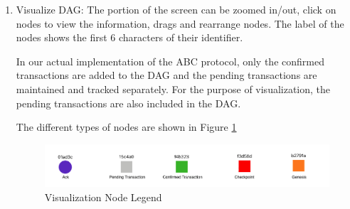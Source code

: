 \begin{enumerate}
	\item Visualize DAG: The portion of the screen can be zoomed in/out, click on nodes to view the information, drags and rearrange nodes. The label of the nodes shows the first 6 characters of their identifier. 
	
	In our actual implementation of the ABC protocol, only the confirmed transactions are added to the DAG and the pending transactions are maintained and tracked separately. For the purpose of visualization, the pending transactions are also included in the DAG.  
	
	The different types of nodes are shown in Figure \ref{fig:ramu_ui_viz_legend}
	\begin{figure}[htbp]
		\centering
		\includegraphics[width=1\linewidth]{figures/images/ramu/v_legend.png}
		\caption{Visualization Node Legend}
		\label{fig:ramu_ui_viz_legend}
	\end{figure}


\end{enumerate}

